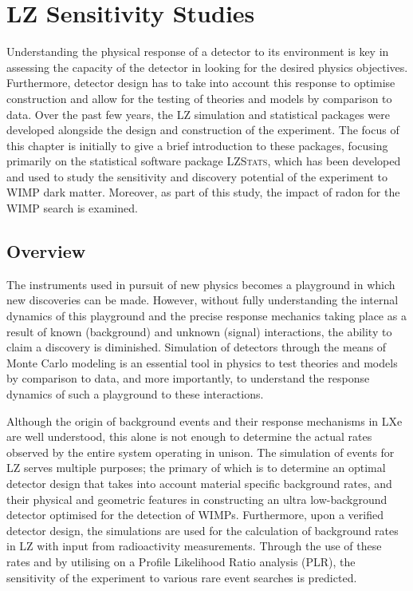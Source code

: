\chapter{LZ Sensitivity Studies}
\label{chap:chap5}

Understanding the physical response of a detector to its environment is key in assessing the capacity of the detector in looking for the desired physics objectives. Furthermore, detector design has to take into account this response to optimise construction and allow for the testing of theories and models by comparison to data. Over the past few years, the LZ simulation and statistical packages were developed alongside the design and construction of the experiment. The focus of this chapter is initially to give a brief introduction to these packages, focusing primarily on the statistical software package \textsc{LZStats}, which has been developed and used to study the sensitivity and discovery potential of the experiment to WIMP dark matter. Moreover, as part of this study, the impact of radon for the WIMP search is examined.


\section{Overview}
\label{sec:overview_5}

The instruments used in pursuit of new physics becomes a playground in which new discoveries can be made. However, without fully understanding the internal dynamics of this playground and the precise response mechanics taking place as a result of known (background) and unknown (signal) interactions, the ability to claim a discovery is diminished. Simulation of detectors through the means of Monte Carlo modeling is an essential tool in physics to test theories and models by comparison to data, and more importantly, to understand the response dynamics of such a playground to these interactions. 

Although the origin of background events and their response mechanisms in LXe are well understood, this alone is not enough to determine the actual rates observed by the entire system operating in unison. The simulation of events for LZ serves multiple purposes; the primary of which is to determine an optimal detector design that takes into account material specific background rates, and their physical and geometric features in constructing an ultra low-background detector optimised for the detection of WIMPs. Furthermore, upon a verified detector design, the simulations are used for the calculation of background rates in LZ with input from radioactivity measurements. Through the use of these rates and by utilising on a Profile Likelihood Ratio analysis (PLR), the sensitivity of the experiment to various rare event searches is predicted. 

